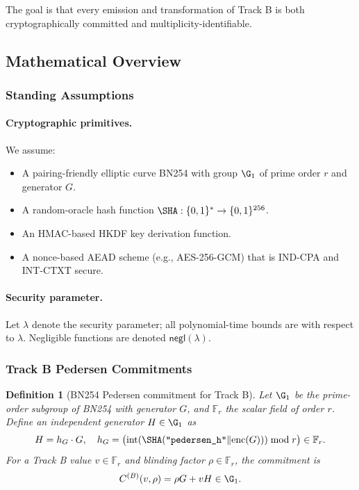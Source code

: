 \documentclass[11pt]{article}
\newtheorem{definition}{Definition}[section]
\newcommand{\F}{\mathbb{F}}
\begin{document}
The goal is that every emission and transformation of Track B is both cryptographically committed and multiplicity-identifiable.

\subsection{Mathematical Overview}

\subsubsection{Standing Assumptions}

\paragraph{Cryptographic primitives.}
We assume:
\begin{itemize}[leftmargin=1.5em]
  \item A pairing-friendly elliptic curve BN254 with group \(\G_1\) of prime order \(r\) and generator \(G\).
  \item A random-oracle hash function \(\SHA: \{0,1\}^* \to \{0,1\}^{256}\).
  \item An HMAC-based HKDF key derivation function.
  \item A nonce-based AEAD scheme (e.g., AES-256-GCM) that is IND-CPA and INT-CTXT secure.
\end{itemize}

\paragraph{Security parameter.}
Let \(\lambda\) denote the security parameter; all polynomial-time bounds are with respect to \(\lambda\).
Negligible functions are denoted \(\mathsf{negl}(\lambda)\).

\subsubsection{Track B Pedersen Commitments}

\begin{definition}[BN254 Pedersen commitment for Track B]
Let \(\G_1\) be the prime-order subgroup of BN254 with generator \(G\), and \(\F_r\) the scalar field of order \(r\).
Define an independent generator \(H \in \G_1\) as
\[
  H = h_G \cdot G, \quad
  h_G = \bigl(\mathrm{int}(\SHA(\texttt{"pedersen\_h"} \| \mathrm{enc}(G))) \bmod r\bigr) \in \F_r.
\]
For a Track B value \(v \in \F_r\) and blinding factor \(\rho \in \F_r\), the commitment is
\[
  C^{(B)}(v, \rho) = \rho G + v H \in \G_1.
\]
\end{definition}
\end{document}
